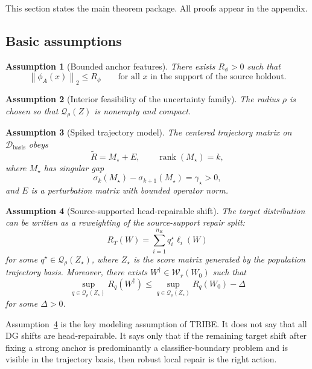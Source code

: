 \documentclass{article}
\newtheorem{assumption}{Assumption}
\newcommand{\cD}{\mathcal{D}}
\newcommand{\cQ}{\mathcal{Q}}
\newcommand{\cW}{\mathcal{W}}
\newcommand{\rank}{\operatorname{rank}}
\newcommand{\tribe}{\textup{\textsc{TRIBE}}}
\newcommand{\1}{\mathbbm{1}}
\newcommand{\norm}[1]{\left\lVert #1 \right\rVert}
\newcommand{\loss}{\ell}
\begin{document}
This section states the main theorem package. All proofs appear in the appendix.

\subsection{Basic assumptions}

\begin{assumption}[Bounded anchor features]
\label{ass:bounded_features}
There exists \(R_\phi > 0\) such that
\[
    \norm{\phi_A(x)}_2 \le R_\phi
    \qquad \text{for all } x \text{ in the support of the source holdout.}
\]
\end{assumption}

\begin{assumption}[Interior feasibility of the uncertainty family]
\label{ass:interior_q}
The radius \(\rho\) is chosen so that \(\cQ_\rho(Z)\) is nonempty and compact.
\end{assumption}

\begin{assumption}[Spiked trajectory model]
\label{ass:spiked}
The centered trajectory matrix on \(\cD_{\mathrm{basis}}\) obeys
\[
    \widetilde R = M_\star + E,
    \qquad
    \rank(M_\star)=k,
\]
where \(M_\star\) has singular gap
\[
    \sigma_k(M_\star) - \sigma_{k+1}(M_\star) = \gamma_\star > 0,
\]
and \(E\) is a perturbation matrix with bounded operator norm.
\end{assumption}

\begin{assumption}[Source-supported head-repairable shift]
\label{ass:head_repairable}
The target distribution can be written as a reweighting of the source-support repair split:
\[
    R_T(W) = \sum_{i=1}^{n_R} q_i^\star \loss_i(W)
\]
for some \(q^\star \in \cQ_\rho(Z_\star)\), where \(Z_\star\) is the score matrix generated by the population trajectory basis. Moreover, there exists \(W^\dagger \in \cW_r(W_0)\) such that
\[
    \sup_{q\in\cQ_\rho(Z_\star)} R_q(W^\dagger)
    \le
    \sup_{q\in\cQ_\rho(Z_\star)} R_q(W_0) - \Delta
\]
for some \(\Delta>0\).
\end{assumption}

Assumption~\ref{ass:head_repairable} is the key modeling assumption of \tribe{}. It does not say that all DG shifts are head-repairable. It says only that if the remaining target shift after fixing a strong anchor is predominantly a classifier-boundary problem and is visible in the trajectory basis, then robust local repair is the right action.
\end{document}
